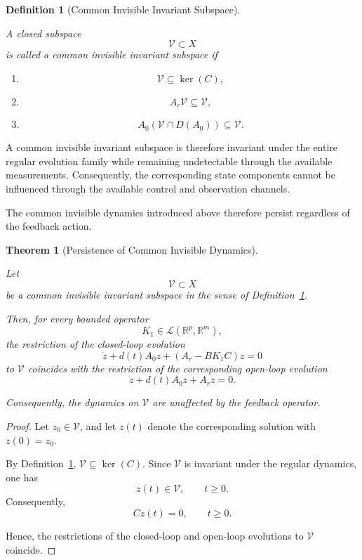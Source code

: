 \documentclass[pdflatex,sn-mathphys-num]{sn-jnl}
\theoremstyle{thmstyleone}%
\newtheorem{theorem}{Theorem}%
\theoremstyle{thmstyletwo}%
\theoremstyle{thmstylethree}%
\newtheorem{definition}{Definition}%
\begin{document}
\begin{definition}[Common Invisible Invariant Subspace]
\label{def:common-invisible}

A closed subspace
\[
\mathcal V\subset X
\]
is called a \emph{common invisible invariant subspace} if

\begin{enumerate}

\item
\[
\mathcal V
\subseteq
\ker(C),
\]

\item
\[
A_r\mathcal V
\subseteq
\mathcal V,
\]

\item
\[
A_0(\mathcal V\cap D(A_0))
\subseteq
\mathcal V.
\]

\end{enumerate}

\end{definition}

A common invisible invariant subspace is therefore invariant under the entire regular evolution family while remaining undetectable through the available measurements. Consequently, the corresponding state components cannot be influenced through the available control and observation channels.

The common invisible dynamics introduced above therefore persist regardless of the feedback action.

\begin{theorem}[Persistence of Common Invisible Dynamics]
\label{thm:persistence}

Let
\[
\mathcal V\subset X
\]
be a common invisible invariant subspace in the sense of Definition~\ref{def:common-invisible}.

Then, for every bounded operator
\[
K_1\in\mathcal L(\mathbb R^p,\mathbb R^m),
\]
the restriction of the closed-loop evolution
\[
\dot z
+
d(t)A_0z
+
(A_r-BK_1C)z
=
0
\]
to
\(
\mathcal V
\)
coincides with the restriction of the corresponding open-loop evolution
\[
\dot z
+
d(t)A_0z
+
A_rz
=
0.
\]

Consequently, the dynamics on \(\mathcal V\) are unaffected by the feedback operator.

\end{theorem}

\begin{proof}

Let \(z_0\in\mathcal V\), and let \(z(t)\) denote the corresponding solution with \(z(0)=z_0\).

By Definition~\ref{def:common-invisible}, \(\mathcal V\subseteq\ker(C)\). Since \(\mathcal V\) is invariant under the regular dynamics, one has
\[
z(t)\in\mathcal V,
\qquad
t\ge0.
\]
Consequently,
\[
Cz(t)=0,
\qquad
t\ge0.
\]

Hence, the restrictions of the closed-loop and open-loop evolutions to \(\mathcal V\) coincide.

\end{proof}
\end{document}
